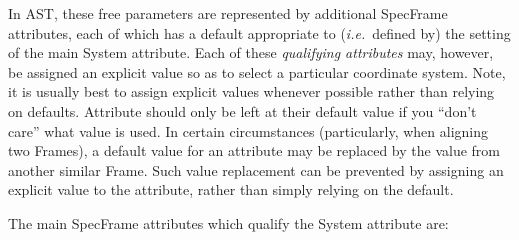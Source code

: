 \documentclass[twoside,11pt]{article}
\begin{document}
In AST, these free parameters are represented by additional SpecFrame
attributes, each of which has a default appropriate to
({\em{i.e.}}\ defined by) the setting of the main System
attribute. Each of these {\em{qualifying attributes}} may, however, be
assigned an explicit value so as to select a particular coordinate
system. Note, it is usually best to assign explicit
values whenever possible rather than relying on defaults. Attribute
should only be left at their default value if you ``don't care'' what
value is used. In certain circumstances (particularly, when aligning two
Frames), a default value for an attribute may be replaced by the value
from another similar Frame. Such value replacement can be prevented by 
assigning an explicit value to the attribute, rather than simply relying on 
the default.


The main SpecFrame attributes which qualify the System attribute are:
\end{document}
